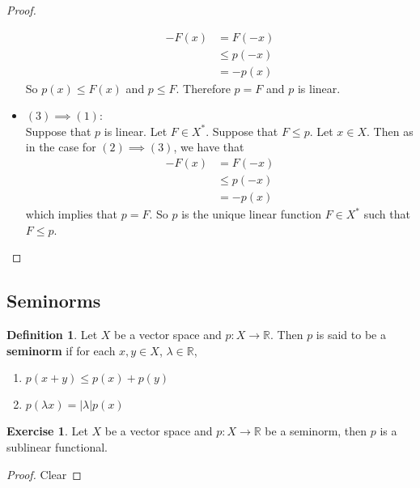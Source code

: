\documentclass[12pt]{amsart}
\theoremstyle{definition}
\newtheorem{defn}[definition]{Definition}
\newtheorem{ex}[definition]{Exercise}
\newcommand{\lam}{\lambda}
\newcommand{\R}{\mathbb{R}}
\newcommand{\tbf}[1]{\textbf{#1}}
\DeclareMathOperator*{\0}{\mbf{0}}
\DeclareMathOperator*{\1}{\mbf{1}}
\newcommand{\lex}[1]{\label{ex:#1}}
\newcommand{\ld}[1]{\label{defn:#1}}
\begin{document}
\begin{proof}
\begin{itemize}
			\begin{align*}
				-F(x) 
				&= F(-x) \\
				& \leq p(-x) \\
				&= -p(x)
			\end{align*}	
			So $p(x) \leq F(x)$ and $p \leq F$. Therefore $p = F$ and $p$ is linear.  
			\item $(3) \implies (1)$: \\ 
			Suppose that $p$ is linear. Let $F \in X^*$. Suppose that $F \leq p$. Let $x \in X$. Then as in the case for $(2) \implies (3)$, we have that
			\begin{align*}
				-F(x) 
				&= F(-x) \\
				& \leq p(-x) \\
				&= -p(x)
			\end{align*}	 
			which implies that $p = F$. So $p$ is the unique linear function $F \in X^*$ such that $F \leq p$.
		\end{itemize}
	\end{proof}
	






















	\newpage
	\subsection{Seminorms}
	\begin{defn} \ld{55005}
		Let $X$ be a vector space and $p:X \rightarrow \R$. Then $ p$ is said to be a \tbf{seminorm} if for each $x,y \in X$, $\lam \in \R$, 
		\begin{enumerate}
			\item $p(x+y) \leq p(x) + p(y)$
			\item $p(\lam x) = |\lam| p(x)$
		\end{enumerate}  
	\end{defn}
	
	\begin{ex} \lex{55006}
		Let $X$ be a vector space and $p: X \rightarrow \R$ be a seminorm, then $p$ is a sublinear functional.
	\end{ex}
	
	\begin{proof}
		Clear
	\end{proof}
\end{document}
